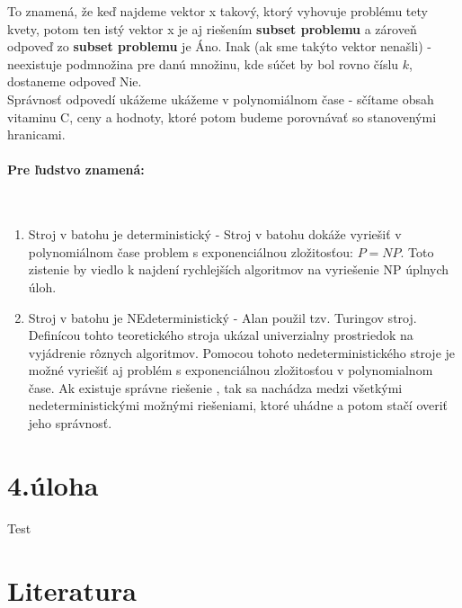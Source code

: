 \documentclass[11pt,a4paper]{article}
\begin{document}
To znamená, že keď najdeme vektor x takový, ktorý vyhovuje problému tety kvety, potom ten istý vektor x je aj riešením \textbf{subset problemu} a zároveň odpoveď zo \textbf{subset problemu} je Áno. Inak (ak sme takýto vektor nenašli) - neexistuje podmnožina pre danú množinu, kde súčet by bol rovno číslu $k$, dostaneme odpoveď Nie. \\

Správnosť odpovedí ukážeme ukážeme v polynomiálnom čase - sčítame obsah vitaminu C, ceny a hodnoty, ktoré potom budeme porovnávať so stanovenými hranicami.


\paragraph{Pre ľudstvo znamená:}\mbox{{}}\\
\begin{enumerate}
    \item Stroj v batohu je deterministický - Stroj v batohu dokáže vyriešiť v polynomiálnom čase problem s exponenciálnou zložitosťou: $ P = NP $. Toto zistenie by viedlo k najdení rychlejších algoritmov na vyriešenie NP úplnych úloh. \\
    \item Stroj v batohu je NEdeterministický - Alan použil tzv. Turingov stroj. Definícou tohto teoretického stroja ukázal univerzialny prostriedok na vyjádrenie rôznych algoritmov. Pomocou tohoto  nedeterministického stroje je možné vyriešiť aj problém s exponenciálnou zložitosťou v polynomialnom čase. Ak existuje správne riešenie , tak sa nachádza medzi všetkými nedeterministickými možnými riešeniami, ktoré uhádne a potom stačí overiť jeho správnosť.
\end{enumerate}


\newpage
\section{4.úloha}
\newpage




























Test \cite{AA}







\newpage
\section{Literatura}

\begin{flushleft}
    
    \end{flushleft}
\end{document}
